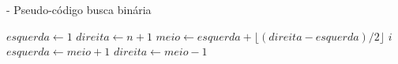 
\begin{algorithm}
    \caption{ - Pseudo-código busca binária \cite[p. 410]{knuth1998art}}
    \begin{algorithmic}[1]
        \STATE $esquerda \leftarrow 1$
        \STATE $direita \leftarrow n + 1$
            \STATE $meio \leftarrow esquerda + \lfloor (direita - esquerda) / 2 \rfloor$
                \RETURN $ i $
                \STATE $esquerda \leftarrow meio + 1$
            \ELSE
                \STATE $direita \leftarrow meio - 1$
            \ENDIF
        \ENDWHILE
        \RETURN \FALSE
    \end{algorithmic}
    \label{alg:busca_binaria}
\end{algorithm}